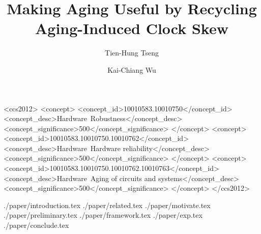 \documentclass[format=acmsmall, review=false, screen=true]{acmart}
\theoremstyle{dotless}
\renewcommand{\thefootnote}{\fnsymbol{footnote}}
\begin{document}
\title[Making Aging Useful by Recycling Aging-Induced Clock Skew]{\fontsize{14}{10}\selectfont Making Aging Useful by Recycling Aging-Induced Clock Skew}


\author{Tien-Hung Tseng}


\author{Kai-Chiang Wu}

\renewcommand{\thefootnote}{\fnsymbol{footnote}}
\begin{abstract}

\end{abstract}


\begin{CCSXML}
<ccs2012>
<concept>
<concept_id>10010583.10010750</concept_id>
<concept_desc>Hardware~Robustness</concept_desc>
<concept_significance>500</concept_significance>
</concept>
<concept>
<concept_id>10010583.10010750.10010762</concept_id>
<concept_desc>Hardware~Hardware reliability</concept_desc>
<concept_significance>500</concept_significance>
</concept>
<concept>
<concept_id>10010583.10010750.10010762.10010763</concept_id>
<concept_desc>Hardware~Aging of circuits and systems</concept_desc>
<concept_significance>500</concept_significance>
</concept>
</ccs2012>
\end{CCSXML}






\maketitle

%
 {./paper/introduction.tex}
 {./paper/related.tex}
 {./paper/motivate.tex}
 {./paper/preliminary.tex}
 {./paper/framework.tex}
 {./paper/exp.tex}
 {./paper/conclude.tex}







\end{document}
